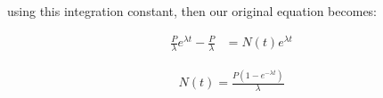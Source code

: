 \documentclass[11pt]{article}
\theoremstyle{definition}
\begin{document}

using this integration constant, then our original equation becomes:

\begin{align}
    \frac{P}{\lambda} e^{\lambda t} - \frac{P}{\lambda}  &= N(t) e^{\lambda t}
\end{align}

\begin{align}
\boxed{
    N(t) = \frac{P \left(1 - e^{-\lambda t} \right)}{\lambda}
}
\end{align}
\end{document}
